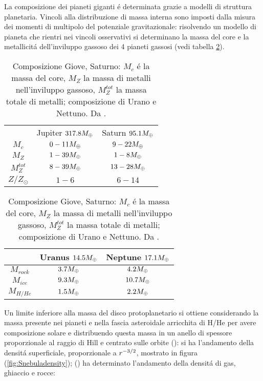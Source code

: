 La composizione dei pianeti giganti \'e determinata grazie a modelli di struttura planetaria. Vincoli alla distribuzione di massa interna sono imposti dalla misura dei momenti di multipolo del potenziale gravitazionale: risolvendo un modello di pianeta che rientri nei vincoli osservativi si determinano la massa del core e la metallicit\'a dell'inviluppo gassoso dei 4 pianeti gassosi (vedi  tabella \ref{tab:JSUNcomp}).

\begin{table}[!htb]
    \begin{minipage}{.5\linewidth}
      \centering
        \begin{tabular}{|ccc|}
\hline
&\parbox{1.5cm}{Jupiter $317.8M_{\oplus}{}$}&\parbox{1.5cm}{Saturn $95.1M_{\oplus}{}$}\\
  $M_c$&$0-11M_{\oplus}{}$&$9-22M_{\oplus}{}$\\
\hline
$M_Z$&$1-39M_{\oplus}{}$&$1-8M_{\oplus}{}$\\
\hline
$M_Z^{tot}$&$8-39M_{\oplus}{}$&$13-28M_{\oplus}{}$\\
\hline
$Z/Z_{\odot}$&$1-6$&$6-14$\\
\hline
 \end{tabular}
    \end{minipage}%
    \begin{minipage}{.5\linewidth}
      \centering
        \begin{tabular}{|ccc|}
\hline
&\parbox{1.5cm}{Uranus $14.5M_{\oplus}{}$}&\parbox{1.5cm}{Neptune $17.1M_{\oplus}{}$}\\
\hline
$M_{rock}$&$3.7M_{\oplus}{}$&$4.2M_{\oplus}{}$\\
\hline
$M_{ice}$&$9.3M_{\oplus}{}$&$10.7M_{\oplus}{}$\\
\hline
$M_{H/He}$&$1.5M_{\oplus}{}$&$2.2M_{\oplus}{}$\\
\hline
        \end{tabular}
    \end{minipage} 
    \caption{Composizione Giove, Saturno: $M_c$ \'e la massa del core, $M_Z$ la massa di metalli nell'inviluppo gassoso, $M_Z^{tot}$ la massa totale di metalli; composizione di Urano e Nettuno. Da \cite{baraffe2009physical}.}\label{tab:JSUNcomp}
\end{table}

Un limite inferiore alla massa del disco protoplanetario si ottiene  considerando la massa presente nei pianeti e nella fascia asteroidale arricchita di H/He per avere composizione solare e distribuendo questa massa in un anello di spessore proporzionale al raggio di Hill e centrato sulle orbite (\cite{weidenschilling1977distribution}): si ha l'andamento della densit\'a superficiale, proporzionale a $r^{-3/2}$, mostrato in figura (\ref{fig:Snebuladensity}); (\cite{hayashi1981structure}) ha determinato l'andamento della densit\'a di gas, ghiaccio e rocce:


